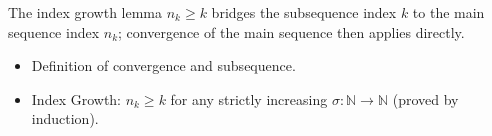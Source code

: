 \begin{remark*}
The index growth lemma $n_k \ge k$ bridges the subsequence index $k$ to
the main sequence index $n_k$; convergence of the main sequence then
applies directly.
\end{remark*}

\begin{remark*}[Dependencies]
\begin{itemize}
  \item Definition of convergence and subsequence.
  \item Index Growth: $n_k \ge k$ for any strictly increasing
        $\sigma : \mathbb{N} \to \mathbb{N}$ (proved by induction).
\end{itemize}
\end{remark*}
